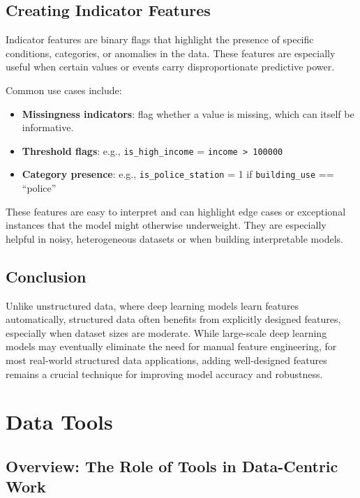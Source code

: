 \documentclass[12pt,openany, draft]{book}
\begin{document}
\section{Creating Indicator Features}

Indicator features are binary flags that highlight the presence of specific conditions, categories, or anomalies in the data. These features are especially useful when certain values or events carry disproportionate predictive power.

Common use cases include:
\begin{itemize}
    \item \textbf{Missingness indicators}: flag whether a value is missing, which can itself be informative.
    \item \textbf{Threshold flags}: e.g., \texttt{is\_high\_income} = \texttt{income > 100000}
    \item \textbf{Category presence}: e.g., \texttt{is\_police\_station} = 1 if \texttt{building\_use} == ``police''
\end{itemize}

These features are easy to interpret and can highlight edge cases or exceptional instances that the model might otherwise underweight. They are especially helpful in noisy, heterogeneous datasets or when building interpretable models.





\section{Conclusion}

Unlike unstructured data, where deep learning models learn features automatically, structured data often benefits from explicitly designed features, especially when dataset sizes are moderate. While large-scale deep learning models may eventually eliminate the need for manual feature engineering, for most real-world structured data applications, adding well-designed features remains a crucial technique for improving model accuracy and robustness.




\chapter{Data Tools}

\section{Overview: The Role of Tools in Data-Centric Work}
\end{document}
